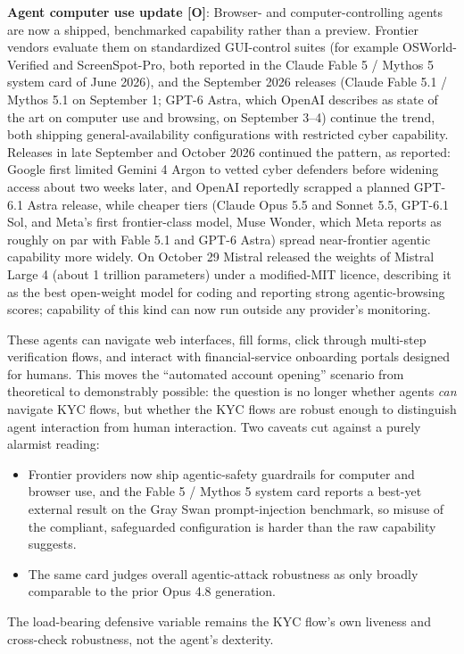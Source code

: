 \documentclass[11pt,letterpaper]{article}
\begin{document}
\textbf{Agent computer use update [O]}: Browser- and computer-controlling agents are now a shipped, benchmarked capability rather than a preview. Frontier vendors evaluate them on standardized GUI-control suites (for example OSWorld-Verified and ScreenSpot-Pro, both reported in the Claude Fable 5 / Mythos 5 system card of June 2026), and the September 2026 releases (Claude Fable 5.1 / Mythos 5.1 on September 1; GPT-6 Astra, which OpenAI describes as state of the art on computer use and browsing, on September 3--4) continue the trend, both shipping general-availability configurations with restricted cyber capability. Releases in late September and October 2026 continued the pattern, as reported: Google first limited Gemini 4 Argon to vetted cyber defenders before widening access about two weeks later, and OpenAI reportedly scrapped a planned GPT-6.1 Astra release, while cheaper tiers (Claude Opus 5.5 and Sonnet 5.5, GPT-6.1 Sol, and Meta's first frontier-class model, Muse Wonder, which Meta reports as roughly on par with Fable 5.1 and GPT-6 Astra) spread near-frontier agentic capability more widely. On October 29 Mistral released the weights of Mistral Large 4 (about 1 trillion parameters) under a modified-MIT licence, describing it as the best open-weight model for coding and reporting strong agentic-browsing scores; capability of this kind can now run outside any provider's monitoring.

These agents can navigate web interfaces, fill forms, click through multi-step verification flows, and interact with financial-service onboarding portals designed for humans. This moves the ``automated account opening'' scenario from theoretical to demonstrably possible: the question is no longer whether agents \textit{can} navigate KYC flows, but whether the KYC flows are robust enough to distinguish agent interaction from human interaction. Two caveats cut against a purely alarmist reading:
\begin{itemize}
  \item Frontier providers now ship agentic-safety guardrails for computer and browser use, and the Fable 5 / Mythos 5 system card reports a best-yet external result on the Gray Swan prompt-injection benchmark, so misuse of the compliant, safeguarded configuration is harder than the raw capability suggests.
  \item The same card judges overall agentic-attack robustness as only broadly comparable to the prior Opus 4.8 generation.
\end{itemize}
The load-bearing defensive variable remains the KYC flow's own liveness and cross-check robustness, not the agent's dexterity.
\end{document}
